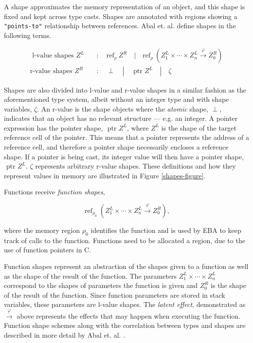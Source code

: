 \newpar A shape approximates the memory representation of an object, and this shape is fixed and kept across type casts. Shapes are annotated with regions showing a \texttt{"points-to"} relationship between references. Abal et. al. define shapes in the following terms. 

\begin{equation*}
\begin{aligned}
    \text { l-value shapes } Z^L \quad &: \quad \text{ref}_{\rho} \:Z^R \quad | \quad \text{ref}_{\rho}\:(Z_1^L \times \cdots \times Z_n^L \stackrel{\varphi}{\rightarrow} Z_0^R)\\
    \text {r-value shapes } Z^R \quad &: \quad \perp \quad | \quad \text { ptr } Z^L \quad | \quad \zeta
\end{aligned}
\end{equation*} 

\noindent Shapes are also divided into l-value and r-value shapes in a similar fashion as the aforementioned type system, albeit without an integer type and with shape variables, $\zeta$. An r-value is the shape objects where the \textit{atomic} shape, $\perp$, indicates that an object has no relevant structure --- e.g. an integer. A pointer expression has the pointer shape, $\text{ ptr } Z^L$, where $Z^L$ is the shape of the target reference cell of the pointer. This means that a pointer represents the address of a reference cell, and therefore a pointer shape necessarily encloses a reference shape. If a pointer is being cast, its integer value will then have a pointer shape, $\text{ ptr } Z^L$. $\zeta$ represents arbitrary r-value shapes. These definitions and how they represent values in memory are illustrated in Figure \ref{shapes-figure}.

\newpar Functions receive \textit{function shapes},

\begin{equation*}
    \operatorname{ref}_{\rho_{0}}\left(Z_{1}^{L} \times \cdots \times Z_{n}^{L} \stackrel{\varphi}{\rightarrow} Z_{0}^{R}\right),
\end{equation*} 

\noindent where the memory region $\rho_0$ identifies the function and is used by EBA to keep track of calls to the function. Functions need to be allocated a region, due to the use of function pointers in C. 

\newpar Function shapes represent an abstraction of the shapes given to a function as well as the shape of the result of the function. The parameters $Z_{1}^{L} \times \cdots \times Z_{n}^{L}$ correspond to the shapes of parameters the function is given and $Z_{0}^{R}$ is the shape of the result of the function. Since function parameters are stored in stack variables, these parameters are l-value shapes. The \textit{latent effect}, demonstrated as $\stackrel{\varphi}{\rightarrow}$ above represents the effects that may happen when executing the function. Function shape schemes along with the correlation between types and shapes are described in more detail by Abal et. al. \cite{Abal2017EffectiveBF}. 

